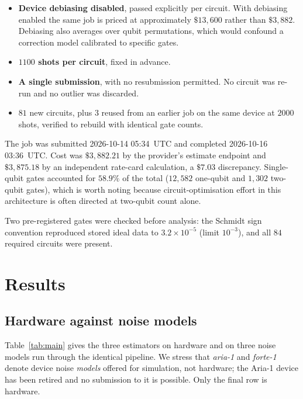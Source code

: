 \documentclass[aps,prx,twocolumn,superscriptaddress,nofootinbib,floatfix]{revtex4-2}
\begin{document}
\begin{itemize}
\item \textbf{Device debiasing disabled}, passed explicitly per circuit.
With debiasing enabled the same job is priced at approximately $\$13{,}600$
rather than $\$3{,}882$. Debiasing also averages over qubit permutations,
which would confound a correction model calibrated to specific gates.
\item \textbf{$1100$ shots per circuit}, fixed in advance.
\item \textbf{A single submission}, with no resubmission permitted. No
circuit was re-run and no outlier was discarded.
\item $81$ new circuits, plus $3$ reused from an earlier job on the same
device at $2000$ shots, verified to rebuild with identical gate counts.
\end{itemize}

The job was submitted 2026-10-14 05:34~UTC and completed 2026-10-16
03:36~UTC. Cost was $\$3{,}882.21$ by the provider's estimate endpoint and
$\$3{,}875.18$ by an independent rate-card calculation, a $\$7.03$
discrepancy. Single-qubit gates accounted for $58.9\%$ of the total
($12{,}582$ one-qubit and $1{,}302$ two-qubit gates), which is worth
noting because circuit-optimisation effort in this architecture is often
directed at two-qubit count alone.

Two pre-registered gates were checked before analysis: the Schmidt sign
convention reproduced stored ideal data to $3.2\times10^{-5}$ (limit
$10^{-3}$), and all $84$ required circuits were present.

\section{Results}

\subsection{Hardware against noise models}

Table~\ref{tab:main} gives the three estimators on hardware and on three
noise models run through the identical pipeline. We stress that
\emph{aria-1} and \emph{forte-1} denote device noise \emph{models} offered
for simulation, not hardware; the Aria-1 device has been retired and no
submission to it is possible. Only the final row is hardware.
\end{document}
